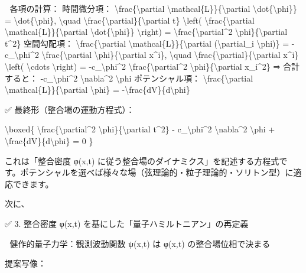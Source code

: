 \documentclass{article}
\begin{document}
📐 各項の計算：
時間微分項：
\textbackslash{}frac\{\textbackslash{}partial \textbackslash{}mathcal\{L\}\}\{\textbackslash{}partial \textbackslash{}dot\{\textbackslash{}phi\}\} = \textbackslash{}dot\{\textbackslash{}phi\}, \textbackslash{}quad \textbackslash{}frac\{\textbackslash{}partial\}\{\textbackslash{}partial t\} \textbackslash{}left( \textbackslash{}frac\{\textbackslash{}partial \textbackslash{}mathcal\{L\}\}\{\textbackslash{}partial \textbackslash{}dot\{\textbackslash{}phi\}\} \textbackslash{}right) = \textbackslash{}frac\{\textbackslash{}partial\textasciicircum{}2 \textbackslash{}phi\}\{\textbackslash{}partial t\textasciicircum{}2\}
空間勾配項：
\textbackslash{}frac\{\textbackslash{}partial \textbackslash{}mathcal\{L\}\}\{\textbackslash{}partial (\textbackslash{}partial\_i \textbackslash{}phi)\} = -c\_\textbackslash{}phi\textasciicircum{}2 \textbackslash{}frac\{\textbackslash{}partial \textbackslash{}phi\}\{\textbackslash{}partial x\textasciicircum{}i\}, \textbackslash{}quad \textbackslash{}frac\{\textbackslash{}partial\}\{\textbackslash{}partial x\textasciicircum{}i\} \textbackslash{}left( \textbackslash{}cdots \textbackslash{}right) = -c\_\textbackslash{}phi\textasciicircum{}2 \textbackslash{}frac\{\textbackslash{}partial\textasciicircum{}2 \textbackslash{}phi\}\{\textbackslash{}partial x\_i\textasciicircum{}2\}
⇒ 合計すると： -c\_\textbackslash{}phi\textasciicircum{}2 \textbackslash{}nabla\textasciicircum{}2 \textbackslash{}phi
ポテンシャル項：
\textbackslash{}frac\{\textbackslash{}partial \textbackslash{}mathcal\{L\}\}\{\textbackslash{}partial \textbackslash{}phi\} = -\textbackslash{}frac\{dV\}\{d\textbackslash{}phi\}

✅ 最終形（整合場の運動方程式）：

\textbackslash{}boxed\{ \textbackslash{}frac\{\textbackslash{}partial\textasciicircum{}2 \textbackslash{}phi\}\{\textbackslash{}partial t\textasciicircum{}2\} - c\_\textbackslash{}phi\textasciicircum{}2 \textbackslash{}nabla\textasciicircum{}2 \textbackslash{}phi + \textbackslash{}frac\{dV\}\{d\textbackslash{}phi\} = 0 \}

これは「整合密度 φ(x,t) に従う整合場のダイナミクス」を記述する方程式です。ポテンシャルを選べば様々な場（弦理論的・粒子理論的・ソリトン型）に適応できます。

次に、

✅ 3. 整合密度 φ(x,t) を基にした「量子ハミルトニアン」の再定義

🧠 健作的量子力学：観測波動関数 ψ(x,t) は φ(x,t) の整合場位相で決まる

提案写像：
\end{document}
